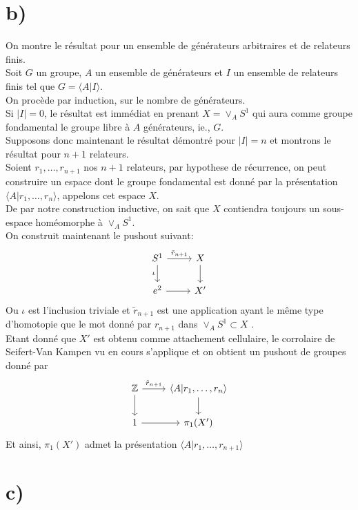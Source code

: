 \documentclass[11pt, a4paper]{article}
\begin{document}
\section*{b)}
On montre le résultat pour un ensemble de générateurs arbitraires et de relateurs finis.\\
Soit $G$ un groupe, $A$ un ensemble de générateurs et $I$ un ensemble de relateurs finis tel que $G = \langle A | I \rangle$.\\
On procède par induction, sur le nombre de générateurs.\\
Si $|I|= 0$, le résultat est immédiat en prenant $X= \vee_A S^{1}$ qui aura comme groupe fondamental le groupe libre à $A$ générateurs, ie., $G$.\\
Supposons donc maintenant le résultat démontré pour $|I|=n$ et montrons le résultat pour $n+1$ relateurs.\\
Soient $r_1, \ldots, r_{n+1} $ nos $n+1$ relateurs, par hypothese de récurrence, on peut construire un espace dont le groupe fondamental est donné par la présentation $ \langle A| r_1, \ldots, r_n\rangle$, appelons cet espace $X$.\\
De par notre construction inductive, on sait que $X$ contiendra toujours un sous-espace homéomorphe à $\vee_A S^{1}$.\\
On construit maintenant le pushout suivant:
\[\begin{tikzcd}
	{ S^1} & {X} \\
	{ e^{2}} & X'
	\arrow["\tilde{ r }_{n+1} ", from=1-1, to=1-2]
	\arrow["\iota"', from=1-1, to=2-1]
	\arrow[from=1-2, to=2-2]
	\arrow[from=2-1, to=2-2]
\end{tikzcd}\]
Ou $\iota$ est l'inclusion triviale et $\tilde{ r }_{n+1} $ est une application ayant le même type d'homotopie que le mot donné par $r_{n+1} $ dans $\vee_A S^{1}\subset X$ .\\
Etant donné que $X'$ est obtenu comme attachement cellulaire, le corrolaire de Seifert-Van Kampen vu en cours s'applique et on obtient un pushout de groupes donné par
\[\begin{tikzcd}
	{ \mathbb{Z}} & { \langle A| r_1, \ldots, r_n\rangle} \\
	{ 1} & \pi_1( X' )
	\arrow["\tilde{ r }_{n+1} ", from=1-1, to=1-2]
	\arrow[from=1-1, to=2-1]
	\arrow[from=1-2, to=2-2]
	\arrow[from=2-1, to=2-2]
\end{tikzcd}\]
Et ainsi, $\pi_1( X') $ admet la présentation $\langle A | r_1, \ldots, r_{n+1} \rangle$ 
\section*{c)}
\end{document}
